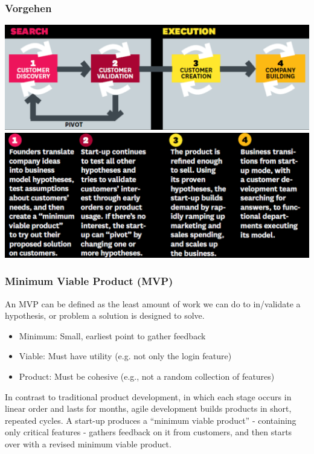 \subsubsection{Vorgehen}
\begin{multicols}{2}
	\includegraphics[width=1\linewidth]{images/lean_vorgehen}
	\includegraphics[width=1\linewidth]{images/lean_vorgehen_2}
\end{multicols}

\subsubsection{Minimum Viable Product (MVP)}
An MVP can be defined as the least amount of work we can do to in/validate a hypothesis, or problem a solution
is designed to solve.
\begin{itemize}
	\item Minimum: Small, earliest point to gather feedback
	\item Viable: Must have utility (e.g. not only the login feature)
	\item Product: Must be cohesive (e.g., not a random collection of features)
\end{itemize}
In contrast to traditional product development, in which each stage occurs in linear order and lasts for months, agile development builds products in short, repeated cycles. A start-up produces a “minimum viable product” - containing only critical features - gathers feedback on it from customers, and then starts over with a revised minimum viable product.

